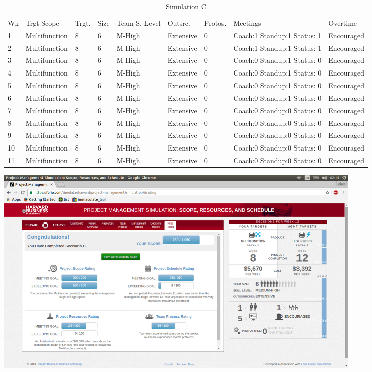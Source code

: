 \documentclass{article}
\begin{document}
\begin{table}[H]
\centering
\caption{Simulation C}
\label{my-label}
\begin{tabular}{lllllllll}
Wk& Trgt Scope& Trgt.& Size& Team S. Level& Outsrc.& Protos.& Meetings                         & Overtime   \\
1  & Multifunction & 8                & 6         & M-High      & Extensive        & 0       & Coach:1 Standup:1 Status: 1 & Encouraged \\
2  & Multifunction & 8                & 6         & M-High      & Extensive        & 0       & Coach:1 Standup:1 Status: 1 & Encouraged \\
3  & Multifunction & 8                & 6         & M-High      & Extensive        & 0       & Coach:0 Standup:1 Status: 0 & Encouraged \\
4  & Multifunction & 8                & 6         & M-High      & Extensive        & 0       & Coach:0 Standup:1 Status: 0 & Encouraged \\
5  & Multifunction & 8                & 6         & M-High      & Extensive        & 0       & Coach:0 Standup:1 Status: 0 & Encouraged \\
6  & Multifunction & 8                & 6         & M-High      & Extensive        & 0       & Coach:0 Standup:1 Status: 0 & Encouraged \\
7  & Multifunction & 8                & 6         & M-High      & Extensive        & 0       & Coach:0 Standup:0 Status: 0 & Encouraged \\
8  & Multifunction & 8                & 6         & M-High      & Extensive        & 0       & Coach:0 Standup:0 Status: 0 & Encouraged \\
9  & Multifunction & 8                & 6         & M-High      & Extensive        & 0       & Coach:0 Standup:0 Status: 0 & Encouraged \\
10 & Multifunction & 8                & 6         & M-High      & Extensive        & 0       & Coach:0 Standup:0 Status: 0 & Encouraged \\
11 & Multifunction & 8                & 6         & M-High      & Extensive        & 0       & Coach:0 Standup:0 Status: 0 & Encouraged
\end{tabular}
\end{table}
\includegraphics[height=4in]{sim_c_real.png}
\end{document}
